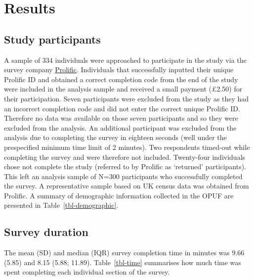 \documentclass[
  number,
  preprint]{elsarticle}
\begin{document}
\section{Results}\label{results}

\subsection{Study participants}\label{study-participants}

A sample of 334 individuals were approached to participate in the study
via the survey company \href{https://www.prolific.com}{Prolific}.
Individuals that successfully inputted their unique Prolific ID and
obtained a correct completion code from the end of the study were
included in the analysis sample and received a small payment (£2.50) for
their participation. Seven participants were excluded from the study as
they had an incorrect completion code and did not enter the correct
unique Prolific ID. Therefore no data was available on those seven
participants and so they were excluded from the analysis. An additional
participant was excluded from the analysis due to completing the survey
in eighteen seconds (well under the prespecified minimum time limit of 2
minutes). Two respondents timed-out while completing the survey and were
therefore not included. Twenty-four individuals chose not complete the
study (referred to by Prolific as `returned' participants). This left an
analysis sample of N=300 participants who successfully completed the
survey. A representative sample based on UK census data was obtained
from Prolific. A summary of demographic information collected in the
OPUF are presented in Table~\ref{tbl-demographic}.

\subsection{Survey duration}\label{survey-duration}

The mean (SD) and median (IQR) survey completion time in minutes was
9.66 (5.85) and 8.15 (5.88; 11.89). Table~\ref{tbl-time} summarises how
much time was spent completing each individual section of the survey.
\end{document}
